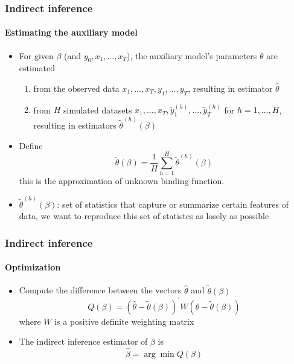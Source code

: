 \documentclass{beamer}
\begin{document}
\begin{frame}\frametitle{Indirect inference}\framesubtitle{Estimating the auxiliary model}
\begin{itemize}
    \item For given $\beta $ (and $y_{0},x_{1},\ldots ,x_{T}$), the auxiliary model's parameters $\theta $ are estimated
    \begin{enumerate}
    \item from the observed data $x_{1},\ldots ,x_{T},y_{1},\ldots ,y_{T}$, resulting in estimator $\hat{\theta}$
    \item from $H$ simulated datasets $x_{1},\ldots ,x_{T},\tilde{y}_{1}^{(h)},\ldots ,\tilde{y}_{T}^{(h)}$ for $h=1,\ldots ,H$, resulting in estimators $\tilde{\theta}^{(h)}(\beta )$
    \end{enumerate}
    \item Define
    \begin{equation*}
    \tilde{\theta}(\beta )=\frac{1}{H}\sum_{h=1}^{H}\tilde{\theta}^{(h)}(\beta )
    \end{equation*}
    this is the approximation of unknown binding function.
    \item $\tilde{\theta}^{(h)}(\beta )$: set of statistics that capture or summarize certain features of data, we want to reproduce this set of statistcs as losely as possible
    \end{itemize}
\end{frame}


\begin{frame}\frametitle{Indirect inference}\framesubtitle{Optimization}
\begin{itemize}
    \item Compute the difference between the vectors $\hat{\theta}$ and $\tilde{\theta}(\beta )$
    \begin{equation*}
    Q(\beta )=\left( \hat{\theta}-\tilde{\theta}(\beta )\right) ^{\prime}W\left( \hat{\theta}-\tilde{\theta}(\beta )\right)
    \end{equation*}
    where $W$ is a positive definite weighting matrix
    \item The indirect inference estimator of $\beta $ is
    \begin{equation*}
    \hat{\beta}=\arg \min Q(\beta)
    \end{equation*}
\end{itemize}
\end{frame}
\end{document}
